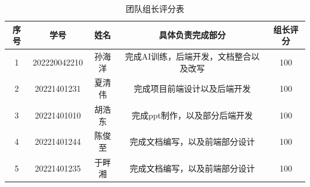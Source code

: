 \documentclass{base}
\numberwithin{figure}{section} %
\begin{document}
\begin{longtable}{@{}ccccc@{}}
\caption{团队组长评分表}
\label{tab:my-table}\\
\toprule
\textbf{序号} & \textbf{学号}  & \textbf{姓名} & \textbf{具体负责完成部分}    & \textbf{组长评分} \\* \midrule
\endhead
%
\bottomrule
\endfoot
%
\endlastfoot
%
1           & 202220042210 & 孙海洋         & 完成AI训练，后端开发，文档整合以及改写 & 100           \\
2           & 20221401231  & 夏清伟         & 完成项目前端设计以及后端开发       & 100           \\
3           & 20221401010  & 胡浩东         & 完成ppt制作，以及部分后端开发     & 100           \\
4           & 20221401244  & 陈俊至         & 完成文档编写，以及前端部分设计      & 100           \\
5           & 20221401235  & 于畔湘         & 完成文档编写，以及前端部分设计      & 100           \\* \bottomrule
\end{longtable}


\end{document}
